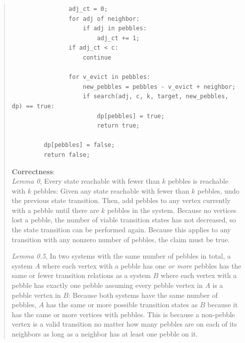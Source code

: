\documentclass[11pt]{article}
\begin{document}
\begin{enumerate}
\begin{enumerate}
\begin{quote}
\begin{verbatim}
                adj_ct = 0;
                for adj of neighbor:
                    if adj in pebbles:
                        adj_ct += 1;
                if adj_ct < c:
                    continue

                for v_evict in pebbles:
                    new_pebbles = pebbles - v_evict + neighbor;
                    if search(adj, c, k, target, new_pebbles, dp) == true:
                        dp[pebbles] = true;
                        return true;

         dp[pebbles] = false;
         return false;
    \end{verbatim}
    \newpage

    \textbf{Correctness}: \\ 
    \textit{Lemma 0}, Every state reachable with fewer than $k$ pebbles is reachable with $k$ pebbles: Given any state reachable with fewer than $k$ pebbles, undo the previous state transition. Then, add pebbles to any vertex currently with a pebble until there are $k$ pebbles in the system. Because no vertices lost a pebble, the number of viable transition states has not decreased, so the state transition can be performed again. Because this applies to any transition with any nonzero number of pebbles, the claim must be true. 

    \medskip
    \textit{Lemma 0.5}, In two systems with the same number of pebbles in total, a system $A$ where each vertex with a pebble has one \textit{or more} pebbles has the same or fewer transition relations as a system $B$ where each vertex with a pebble has exactly one pebble assuming every pebble vertex in $A$ is a pebble vertex in $B$: Because both systems have the same number of pebbles, $A$ has the same or more possible transition states as $B$ because it has the same or more vertices with pebbles. This is because a non-pebble vertex is a valid transition no matter how many pebbles are on each of its neighbors as long as a neighbor has at least one pebble on it.    


\end{quote}
\end{enumerate}
\end{enumerate}
\end{document}
